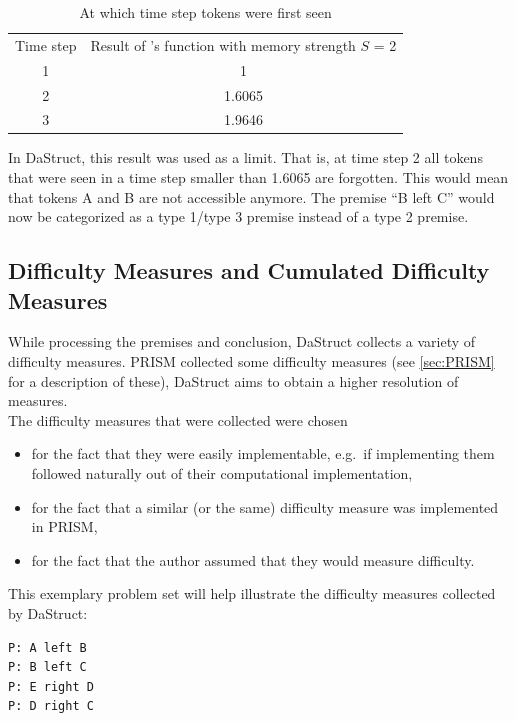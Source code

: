 \documentclass[hidelinks]{scrartcl}
\begin{document}
\begin{table}[H]
	\begin{tabular}{| c c |}
	\hline
	Time step 	& Result of \cite{Yffelti.2016}'s function with memory strength $S$ = 2	\\
	1			& 1											\\
	2			& 1.6065									\\
	3			& 1.9646									\\
	\hline
	\end{tabular}
	\caption{At which time step \gls{token}s were first seen}
\end{table}

In DaStruct, this result was used as a limit. That is, at time step 2 all \gls{token}s that were seen in a time step smaller than 1.6065 are forgotten. This would mean that \gls{token}s A and B are not accessible anymore. The premise ``B left C'' would now be categorized as a type 1/type 3 premise instead of a type 2 premise.

\subsection{Difficulty Measures and Cumulated Difficulty Measures}\label{sec:difficulty_measures}
While processing the \gls{premise}s and conclusion, DaStruct collects a variety of difficulty measures. PRISM collected some difficulty measures (see \ref{sec:PRISM} for a description of these), DaStruct aims to obtain a higher resolution of measures. \\
The difficulty measures that were collected were chosen 
\begin{itemize}
	\item for the fact that they were easily implementable, e.g.\ if implementing them followed naturally out of their computational implementation,
	\item for the fact that a similar (or the same) difficulty measure was implemented in PRISM,
	\item for the fact that the author assumed that they would measure difficulty.
\end{itemize}
This exemplary problem set will help illustrate the difficulty measures collected by DaStruct:

\begin{lstlisting}[caption=Exemplary problem file, label=pf:example_pf_diff_measures, frame=single]
P: A left B
P: B left C
P: E right D
P: D right C
\end{lstlisting}
\end{document}
